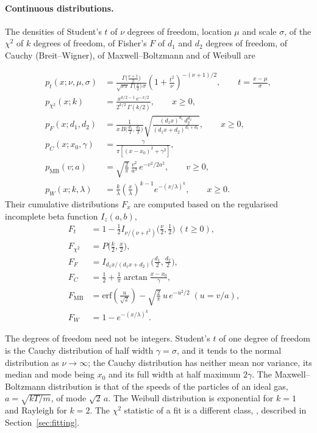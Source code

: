 \paragraph{Continuous distributions.}
The densities of Student's $t$ of $\nu$ degrees of freedom, location $\mu$ and scale $\sigma$, of the $\chi^2$ of $k$ degrees of freedom, of Fisher's $F$ of $d_1$ and $d_2$ degrees of freedom, of Cauchy (Breit--Wigner), of Maxwell--Boltzmann and of Weibull are
\begin{widetext}
	\begin{align}
  p_t(x;\nu,\mu,\sigma) &= \frac{\Gamma\bigl(\tfrac{\nu+1}{2}\bigr)}{\sqrt{\nu\pi}\,\Gamma\bigl(\tfrac{\nu}{2}\bigr)\,\sigma}
     \left(1 + \frac{t^2}{\nu}\right)^{-(\nu+1)/2}, \qquad t = \frac{x-\mu}{\sigma}, \\
  p_{\chi^2}(x;k) &= \frac{x^{k/2-1}\, e^{-x/2}}{2^{k/2}\,\Gamma(k/2)}, \qquad x \ge 0, \\
  p_F(x;d_1,d_2) &= \frac{1}{x\, B\bigl(\tfrac{d_1}{2},\tfrac{d_2}{2}\bigr)}
     \sqrt{\frac{(d_1 x)^{d_1}\, d_2^{d_2}}{(d_1 x + d_2)^{d_1 + d_2}}}, \qquad x \ge 0, \\
  p_C(x;x_0,\gamma) &= \frac{\gamma}{\pi\left[(x-x_0)^2 + \gamma^2\right]}, \\
  p_{\mathrm{MB}}(v;a) &= \sqrt{\frac{2}{\pi}}\, \frac{v^2}{a^3}\, e^{-v^2/2a^2}, \qquad v \ge 0, \\
  p_W(x;k,\lambda) &= \frac{k}{\lambda} \left(\frac{x}{\lambda}\right)^{k-1} e^{-(x/\lambda)^k}, \qquad x \ge 0 .
\end{align}
Their cumulative distributions $F_x$ are computed based on the regularised incomplete beta function $I_z(a,b)$,
	\begin{align}
  F_t &= 1 - \tfrac{1}{2} I_{\nu/(\nu + t^2)}\bigl(\tfrac{\nu}{2}, \tfrac{1}{2}\bigr) \;(t \ge 0), \quad \\
  F_{\chi^2} &= P\bigl(\tfrac{k}{2}, \tfrac{x}{2}\bigr), \quad\\
  F_F &= I_{d_1 x/(d_1 x + d_2)}\bigl(\tfrac{d_1}{2}, \tfrac{d_2}{2}\bigr),\\
  F_C &= \frac{1}{2} + \frac{1}{\pi}\arctan\frac{x - x_0}{\gamma}, \quad\\
  F_{\mathrm{MB}}& = \mathrm{erf}\left(\frac{u}{\sqrt{2}}\right) - \sqrt{\frac{2}{\pi}}\, u\, e^{-u^2/2} \;(u = v/a), \quad\\
  F_W &= 1 - e^{-(x/\lambda)^k} .
\end{align}
\end{widetext}
The degrees of freedom need not be integers. Student's $t$ of one degree of freedom is the Cauchy distribution of
half width $\gamma = \sigma$, and it tends to the normal distribution as $\nu \to \infty$; the Cauchy distribution has
neither mean nor variance, its median and mode being $x_0$ and its full width at half maximum $2\gamma$. The
Maxwell--Boltzmann distribution is that of the speeds of the particles of an ideal gas, $a = \sqrt{kT/m}$, of mode $\sqrt{2}\,a$. The Weibull distribution is exponential for $k = 1$ and Rayleigh for $k = 2$. The $\chi^2$ statistic of a fit is a different class, , described in Section~\ref{sec:fitting}.

